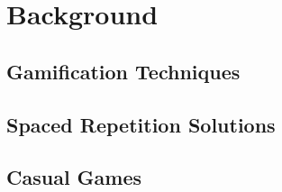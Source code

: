 
\chapter{Background} %

\label{back} %


\section{Gamification Techniques}

\section{Spaced Repetition Solutions}

\section{Casual Games}
